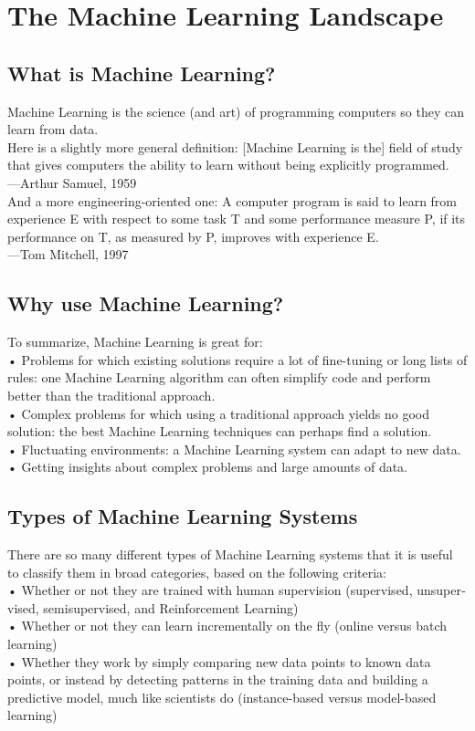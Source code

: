 \section*{The Machine Learning Landscape}
\subsection*{What is Machine Learning?}
Machine Learning is the science (and art) of programming computers so they can
learn from data.\\
Here is a slightly more general definition:
[Machine Learning is the] field of study that gives computers the ability to learn
without being explicitly programmed.\\
—Arthur Samuel, 1959\\
And a more engineering-oriented one:
A computer program is said to learn from experience E with respect to some task T
and some performance measure P, if its performance on T, as measured by P,
improves with experience E.\\
—Tom Mitchell, 1997

\subsection*{Why use Machine Learning?}
To summarize, Machine Learning is great for:\\
• Problems for which existing solutions require a lot of fine-tuning or long lists of
rules: one Machine Learning algorithm can often simplify code and perform better than the traditional approach.\\
• Complex problems for which using a traditional approach yields no good solution: the best Machine Learning techniques can perhaps find a solution.\\
• Fluctuating environments: a Machine Learning system can adapt to new data.\\
• Getting insights about complex problems and large amounts of data.\\

\subsection*{Types of Machine Learning Systems}
There are so many different types of Machine Learning systems that it is useful to
classify them in broad categories, based on the following criteria:\\
• Whether or not they are trained with human supervision (supervised, unsuper‐
vised, semisupervised, and Reinforcement Learning)\\
• Whether or not they can learn incrementally on the fly (online versus batch
learning)\\
• Whether they work by simply comparing new data points to known data points,
or instead by detecting patterns in the training data and building a predictive
model, much like scientists do (instance-based versus model-based learning)\\

